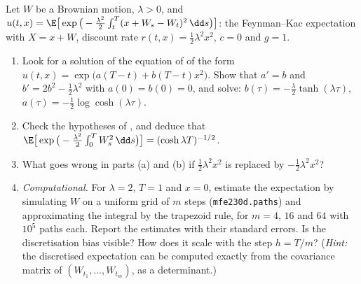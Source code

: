 \begin{exercise}\label{ex:sm-quadratic}
\hard Let $W$ be a Brownian motion, $\lambda>0$, and
$u(t,x)=\E\big[\exp\big(-\frac{\lambda^2}{2}\int_t^T(x+W_s-W_t)^2\,\dd s\big)\big]$: the
Feynman--Kac expectation with $X=x+W$, discount rate $r(t,x)=\frac12\lambda^2x^2$, $c=0$ and $g=1$.
\begin{enumerate}[label=(\alph*)]
  \item Look for a solution of the equation of  of the form
    $u(t,x)=\exp\big(a(T-t)+b(T-t)x^2\big)$. Show that $a'=b$ and $b'=2b^2-\frac12\lambda^2$ with
    $a(0)=b(0)=0$, and solve: $b(\tau)=-\frac\lambda2\tanh(\lambda\tau)$,
    $a(\tau)=-\frac12\log\cosh(\lambda\tau)$.
  \item Check the hypotheses of , and deduce that
    $\E\big[\exp\big(-\frac{\lambda^2}2\int_0^TW_s^2\,\dd s\big)\big]=(\cosh\lambda T)^{-1/2}$.
  \item What goes wrong in parts (a) and (b) if $\frac12\lambda^2x^2$ is replaced by
    $-\frac12\lambda^2x^2$?
  \item \emph{Computational.} For $\lambda=2$, $T=1$ and $x=0$, estimate the expectation by
    simulating $W$ on a uniform grid of $m$ steps (\texttt{mfe230d.paths}) and approximating the
    integral by the trapezoid rule, for $m=4$, $16$ and $64$ with $10^5$ paths each. Report the
    estimates with their standard errors. Is the discretisation bias visible? How does it scale
    with the step $h=T/m$? (\emph{Hint:} the discretised expectation can be computed exactly from
    the covariance matrix of $(W_{t_1},\dots,W_{t_m})$, as a determinant.)
\end{enumerate}
\end{exercise}
